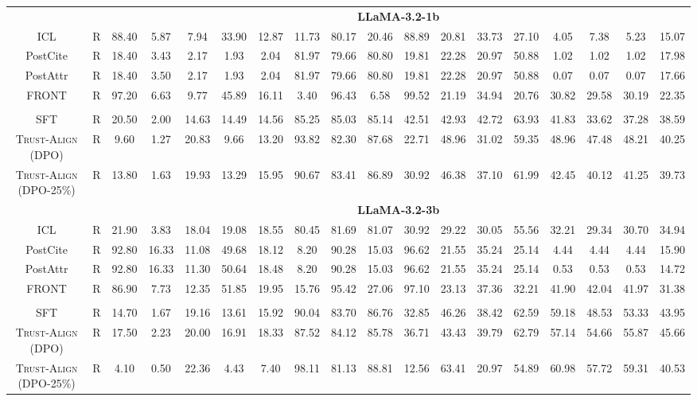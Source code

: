 \documentclass{article} %
\newcommand{\method}[0]{\textsc{Trust-Align}}
\begin{document}
\begin{table}[htb!]
{\begin{tabular}{ccc*{15}c}
& & \multicolumn{16}{c}{\cellcolor[gray]{0.9}\textbf{LLaMA-3.2-1b}} \\
ICL & R & 88.40 & 5.87 & 7.94 & 33.90 & 12.87 & 11.73 & 80.17 & 20.46 & 88.89 & 20.81 & 33.73 & 27.10 & 4.05 & 7.38 & 5.23 & 15.07 \\
PostCite & R & 18.40 & 3.43 & 2.17 & 1.93 & 2.04 & 81.97 & 79.66 & 80.80 & 19.81 & 22.28 & 20.97 & 50.88 & 1.02 & 1.02 & 1.02 & 17.98 \\
PostAttr & R & 18.40 & 3.50 & 2.17 & 1.93 & 2.04 & 81.97 & 79.66 & 80.80 & 19.81 & 22.28 & 20.97 & 50.88 & 0.07 & 0.07 & 0.07 & 17.66 \\
FRONT & R & 97.20 & 6.63 & 9.77 & 45.89 & 16.11 & 3.40 & 96.43 & 6.58 & 99.52 & 21.19 & 34.94 & 20.76 & 30.82 & 29.58 & 30.19 & 22.35 \\\\

SFT & R & 20.50 & 2.00 & 14.63 & 14.49 & 14.56 & 85.25 & 85.03 & 85.14 & 42.51 & 42.93 & 42.72 & 63.93 & 41.83 & 33.62 & 37.28 & 38.59 \\
\method{} (DPO) & R & 9.60 & 1.27 & 20.83 & 9.66 & 13.20 & 93.82 & 82.30 & 87.68 & 22.71 & 48.96 & 31.02 & 59.35 & 48.96 & 47.48 & 48.21 & 40.25 \\
\method{} (DPO-25\%) & R & 13.80 & 1.63 & 19.93 & 13.29 & 15.95 & 90.67 & 83.41 & 86.89 & 30.92 & 46.38 & 37.10 & 61.99 & 42.45 & 40.12 & 41.25 & 39.73 \\ 

& & \multicolumn{16}{c}{\cellcolor[gray]{0.9}\textbf{LLaMA-3.2-3b}} \\
ICL & R & 21.90 & 3.83 & 18.04 & 19.08 & 18.55 & 80.45 & 81.69 & 81.07 & 30.92 & 29.22 & 30.05 & 55.56 & 32.21 & 29.34 & 30.70 & 34.94 \\
PostCite & R & 92.80 & 16.33 & 11.08 & 49.68 & 18.12 & 8.20 & 90.28 & 15.03 & 96.62 & 21.55 & 35.24 & 25.14 & 4.44 & 4.44 & 4.44 & 15.90 \\
PostAttr & R & 92.80 & 16.33 & 11.30 & 50.64 & 18.48 & 8.20 & 90.28 & 15.03 & 96.62 & 21.55 & 35.24 & 25.14 & 0.53 & 0.53 & 0.53 & 14.72 \\
FRONT & R & 86.90 & 7.73 & 12.35 & 51.85 & 19.95 & 15.76 & 95.42 & 27.06 & 97.10 & 23.13 & 37.36 & 32.21 & 41.90 & 42.04 & 41.97 & 31.38 \\\\

SFT & R & 14.70 & 1.67 & 19.16 & 13.61 & 15.92 & 90.04 & 83.70 & 86.76 & 32.85 & 46.26 & 38.42 & 62.59 & 59.18 & 48.53 & 53.33 & 43.95 \\
\method{} (DPO) & R & 17.50 & 2.23 & 20.00 & 16.91 & 18.33 & 87.52 & 84.12 & 85.78 & 36.71 & 43.43 & 39.79 & 62.79 & 57.14 & 54.66 & 55.87 & 45.66 \\
\method{} (DPO-25\%) & R & 4.10 & 0.50 & 22.36 & 4.43 & 7.40 & 98.11 & 81.13 & 88.81 & 12.56 & 63.41 & 20.97 & 54.89 & 60.98 & 57.72 & 59.31 & 40.53 \\


\end{tabular}}
\end{table}
\end{document}
